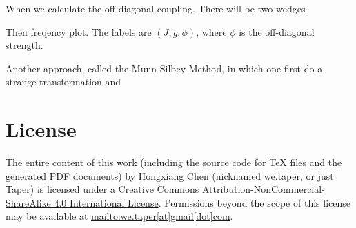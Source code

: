 \documentclass{article}
\numberwithin{equation}{subsection} %
\theoremstyle{definition}
\begin{document}
When we calculate the off-diagonal coupling. There will be two
wedges

Then freqency plot. The labels are $(J,g,\phi)$, where $\phi$
is the off-diagonal strength.

Another approach, called the Munn-Silbey Method,
in which one first do a strange transformation
and 
\section{License}
The entire content of this work (including the source code
for TeX files and the generated PDF documents) by 
Hongxiang Chen (nicknamed we.taper, or just Taper) is
licensed under a 
\href{http://creativecommons.org/licenses/by-nc-sa/4.0/}{Creative 
Commons Attribution-NonCommercial-ShareAlike 4.0 International 
License}. Permissions beyond the scope of this 
license may be available at \url{mailto:we.taper[at]gmail[dot]com}.
\end{document}
